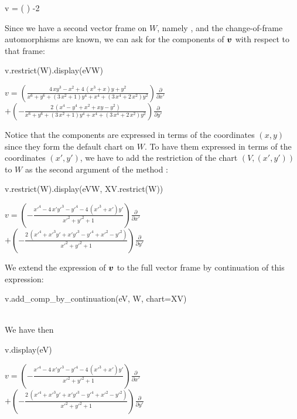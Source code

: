 \begin{NBoutM}
v = \left(  \right)  -2 
\end{NBoutM}
Since we have a second vector frame on $W$, namely , and the
change-of-frame automorphisms are known, we can ask for the components
of $\bm{v}$ with respect to that frame:
\begin{NBin}
v.restrict(W).display(eVW)
\end{NBin}
\begin{NBout}
$\displaystyle
v = \left( \frac{4 \, x y^{3} - x^{2} + 4 \, {\left(x^{3} + x\right)} y + y^{2}}{x^{6} + y^{6} + {\left(3 \, x^{2} + 1\right)} y^{4} + x^{4} + {\left(3 \, x^{4} + 2 \, x^{2}\right)} y^{2}} \right) \frac{\partial}{\partial {x'} }$ \\
$\displaystyle
+ \left( -\frac{2 \, {\left(x^{4} - y^{4} + x^{2} + x y - y^{2}\right)}}{x^{6} + y^{6} + {\left(3 \, x^{2} + 1\right)} y^{4} + x^{4} + {\left(3 \, x^{4} + 2 \, x^{2}\right)} y^{2}} \right) \frac{\partial}{\partial {y'} }$
\end{NBout}
Notice that the components are expressed in terms of the coordinates $(x,y)$
since they form the default chart on $W$. To have them expressed in
terms of the coordinates $(x',y')$, we have to add the restriction of
the chart
$(V,(x',y'))$ to $W$ as the second argument of the method
:
\begin{NBin}
v.restrict(W).display(eVW, XV.restrict(W))
\end{NBin}
\begin{NBout}
$\displaystyle
v = \left( -\frac{{x'}^{4} - 4 \, {x'} {y'}^{3} - {y'}^{4} - 4 \, {\left({x'}^{3} + {x'}\right)} {y'}}{{x'}^{2} + {y'}^{2} + 1} \right) \frac{\partial}{\partial {x'} } $\\
$\displaystyle
+ \left( -\frac{2 \, {\left({x'}^{4} + {x'}^{3} {y'} + {x'} {y'}^{3} - {y'}^{4} + {x'}^{2} - {y'}^{2}\right)}}{{x'}^{2} + {y'}^{2} + 1} \right) \frac{\partial}{\partial {y'} }$
\end{NBout}
We extend the expression of $\bm{v}$ to the full vector frame 
by continuation of this expression:
\begin{NBin}
v.add_comp_by_continuation(eV, W, chart=XV)
\end{NBin}
\ \\
We have then
\begin{NBin}
v.display(eV)
\end{NBin}
\begin{NBout}
$\displaystyle
v = \left( -\frac{{x'}^{4} - 4 \, {x'} {y'}^{3} - {y'}^{4} - 4 \, {\left({x'}^{3} + {x'}\right)} {y'}}{{x'}^{2} + {y'}^{2} + 1} \right) \frac{\partial}{\partial {x'} }$\\
$\displaystyle
 + \left( -\frac{2 \, {\left({x'}^{4} + {x'}^{3} {y'} + {x'} {y'}^{3} - {y'}^{4} + {x'}^{2} - {y'}^{2}\right)}}{{x'}^{2} + {y'}^{2} + 1} \right) \frac{\partial}{\partial {y'} }$
\end{NBout}
